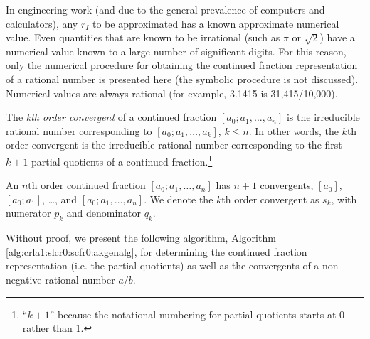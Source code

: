 In engineering work (and due to the general prevalence of computers
and calculators), any $r_I$ to be approximated has a known approximate
numerical value.  Even quantities that are known to be irrational (such
as $\pi$ or $\sqrt{2}$) have a numerical value known to a large number
of significant digits.  For this reason, only the numerical procedure for
obtaining the continued fraction representation of a rational number is
presented here (the symbolic procedure is not discussed).  Numerical values
are always rational (for example, 3.1415 is 31,415/10,000).

The \emph{kth order convergent} of a continued fraction
$[a_0; a_1, \ldots{}, a_n]$ is the irreducible rational number
corresponding to $[a_0; a_1, \ldots{}, a_k]$, $k \leq n$.
In other words, the $k$th order convergent is the irreducible rational number
corresponding to the first $k+1$ partial quotients of a 
continued fraction.\footnote{``$k+1$'' because the notational
numbering
for partial quotients starts at 0 rather than 1.} 

An $n$th order continued fraction $[a_0; a_1, \ldots{}, a_n]$
has $n+1$ convergents, $[a_0]$, 
$[a_0; a_1]$, \ldots{}, and $[a_0; a_1, \ldots{}, a_n]$.
We denote the $k$th order convergent as $s_k$, with numerator
$p_k$ and denominator $q_k$.

Without proof, we present the following algorithm, Algorithm 
\ref{alg:crla1:slcr0:scfr0:akgenalg}, for
determining the continued fraction representation (i.e. the partial
quotients) as well as the convergents of a non-negative
rational number $a/b$.

